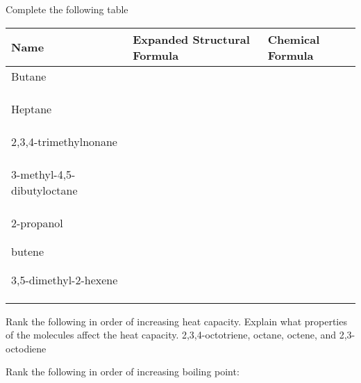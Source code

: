 \documentclass[addpoints, 12pt]{exam}
\begin{document}
\begin{questions}

\newpage
\question[25] Complete the following table

\begin{tabular}{l|l|l}
Name & Expanded Structural Formula & Chemical Formula \\
\hline
Butane & & \\
 & & \\
 & & \\
 & & \\
\hline
Heptane & & \\
& & \\ & & \\ & & \\ \hline
2,3,4-trimethylnonane & & \\
& & \\ & & \\ & & \\ \hline
3-methyl-4,5-dibutyloctane & & \\
& & \\ & & \\ & & \\ \hline
2-propanol
& & \\ & & \\ & & \\ \hline
butene
& & \\ & & \\ & & \\ \hline
3,5-dimethyl-2-hexene & & \\
& & \\ & & \\ & & \\ \hline
\end{tabular}


\question[5] Rank the following in order of increasing heat capacity.
Explain what properties of the molecules affect the heat capacity.
2,3,4-octotriene, octane, octene, and 2,3-octodiene

\vspace{1cm}

\question[10] Rank the following in order of increasing boiling point:
\begin{parts}

\end{parts}
\end{questions}
\end{document}
